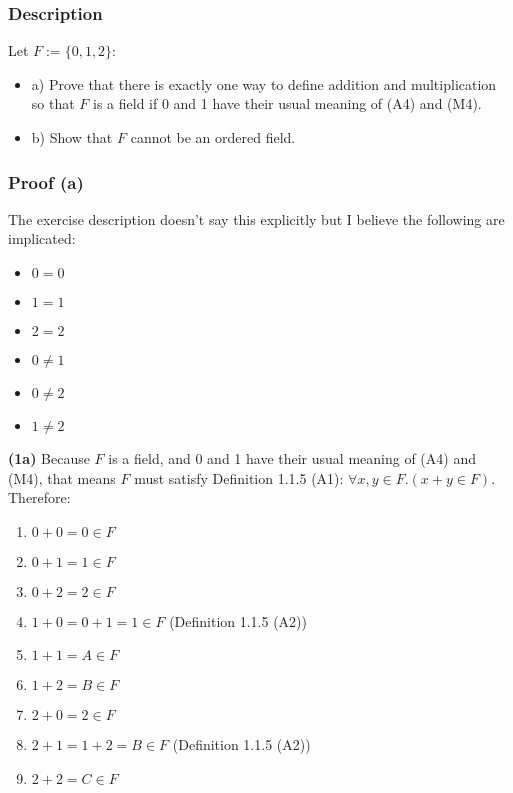 \documentclass[12pt, letterpaper, oneside]{book}
\begin{document}
\subsubsection{Description}

Let $F := \{ 0, 1, 2 \}$:
\begin{itemize}
  \item a) Prove that there is exactly one way to define addition and multiplication so that $F$ is a field if 0 and 1
        have their usual meaning of (A4) and (M4).
  \item b) Show that $F$ cannot be an ordered field.
\end{itemize}

\subsubsection{Proof (a)}

The exercise description doesn't say this explicitly but I believe the following are implicated:
\begin{itemize}
  \item $0 = 0$
  \item $1 = 1$
  \item $2 = 2$
  \item $0 \ne 1$
  \item $0 \ne 2$
  \item $1 \ne 2$
\end{itemize}

\textbf{(1a)} Because $F$ is a field, and 0 and 1 have their usual meaning of (A4) and (M4), that means $F$ must satisfy Definition
1.1.5 (A1): $\forall x, y \in F. (x + y \in F)$. Therefore:
\begin{enumerate}
  \item $0 + 0 = 0 \in F$
  \item $0 + 1 = 1 \in F$
  \item $0 + 2 = 2 \in F$
  \item $1 + 0 = 0 + 1 = 1 \in F$ (Definition 1.1.5 (A2))
  \item $1 + 1 = A \in F$
  \item $1 + 2 = B \in F$
  \item $2 + 0 = 2 \in F$
  \item $2 + 1 = 1 + 2 = B \in F$ (Definition 1.1.5 (A2))
  \item $2 + 2 = C \in F$
\end{enumerate}
\end{document}
